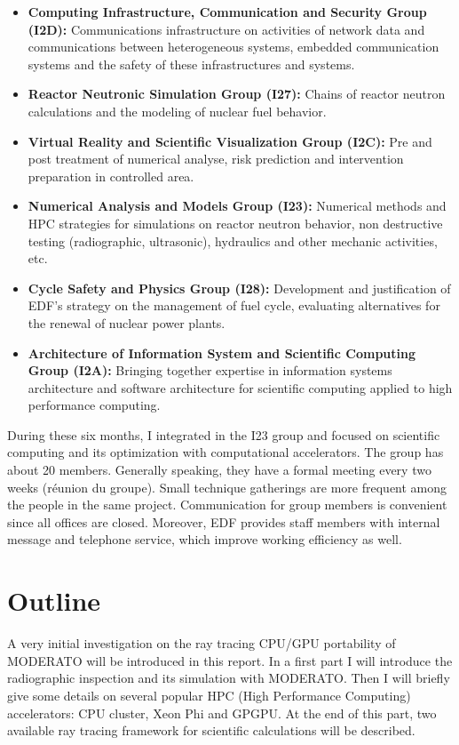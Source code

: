 \begin{itemize}
  \it
  \item \textbf{Computing Infrastructure, Communication and Security Group (I2D): }Communications infrastructure on activities of network data and communications between heterogeneous systems, embedded communication systems and the safety of these infrastructures and systems.
  \item \textbf{Reactor Neutronic Simulation Group (I27):} Chains of reactor neutron calculations and the modeling of nuclear fuel behavior.
  \item \textbf{Virtual Reality and Scientific Visualization Group (I2C):} Pre and post treatment of numerical analyse, risk prediction and intervention preparation in controlled area.
	\item \textbf{Numerical Analysis and Models Group (I23):} Numerical methods and HPC strategies  for simulations on reactor neutron behavior, non destructive testing (radiographic, ultrasonic), hydraulics and other mechanic activities, etc.
	\item \textbf{Cycle Safety and Physics Group (I28):} Development and justification of EDF's strategy on the management of fuel cycle, evaluating alternatives for the renewal of nuclear power plants.
	\item \textbf{Architecture of Information System and Scientific Computing Group (I2A):} Bringing together expertise in information systems architecture and software architecture for scientific computing applied to high performance computing.
\end{itemize}
During these six months, I integrated in the I23 group and focused on scientific computing and its optimization with computational accelerators. The group has about 20 members. Generally speaking, they have a formal meeting every two weeks (réunion du groupe). Small technique gatherings are more frequent among the people in the same project. Communication for group members is convenient since all offices are closed. Moreover, EDF provides staff members with internal message and telephone service, which improve working efficiency as well.

\section{Outline}
A very initial investigation on the ray tracing CPU/GPU portability of MODERATO will be introduced in this report. In a first part I will introduce the radiographic inspection and its simulation with MODERATO. Then I will briefly give some details on several popular HPC (High Performance Computing) accelerators: CPU cluster, Xeon Phi and GPGPU. At the end of this part, two available ray tracing framework for scientific calculations will be described.

